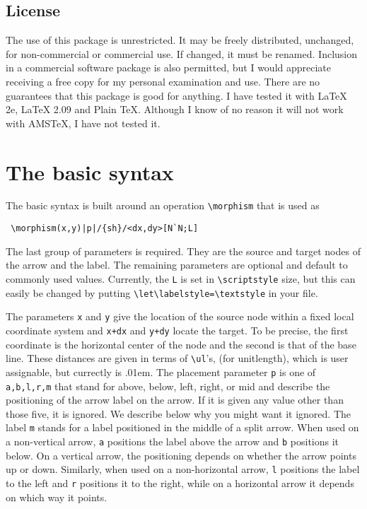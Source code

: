 \documentclass[12pt]{article}
\begin{document}
{\subsection{License}
 The use of this package is unrestricted.  It may be freely distributed,
unchanged, for non-commercial or commercial use.  If changed, it must be
renamed.  Inclusion in a commercial software package is also permitted,
but I would appreciate receiving a free copy for my personal examination
and use.  There are no guarantees that this package is good for
anything.  I have tested it with LaTeX 2e, LaTeX 2.09 and Plain TeX.
Although I know of no reason it will not work with AMSTeX, I have not
tested it.

\section{The basic syntax}

The basic syntax is built around an operation
\verb.\morphism.  that is
used as 
 \begin{verbatim}
 \morphism(x,y)|p|/{sh}/<dx,dy>[N`N;L]
 \end{verbatim}
 The last group of parameters is required.  They are the source and
target nodes of the arrow and the label.  The remaining parameters are
optional and default to commonly used values.  Currently, the
\verb.L. is set in \verb.\scriptstyle.
size, but this can easily be changed by putting
\verb.\let\labelstyle=\textstyle. in
your file.

 The parameters \verb.x. and \verb.y. give the location of the source
node within a fixed local coordinate system and \verb-x+dx- and
\verb-y+dy- locate the target.  To be precise, the first coordinate is
the horizontal center of the node and the second is that of the base
line.  These distances are given in terms of \verb.\ul.'s,
(for unitlength), which is user assignable, but currectly is .01em.  The
placement parameter \verb.p. is one of \verb.a,b,l,r,m. that stand for
above, below, left, right, or mid and describe the positioning of the
arrow label on the arrow.  If it is given any value other than those
five, it is ignored.  We describe below why you might want it ignored.
The label \verb.m. stands for a label positioned in the middle
of a split arrow.  When used on a non-vertical arrow, \verb.a.
positions the label above the arrow and \verb.b. positions it
below.  On a vertical arrow, the positioning depends on whether the
arrow points up or down.  Similarly, when used on a non-horizontal
arrow, \verb.l. positions the label to the left and
\verb.r. positions it to the right, while on a horizontal arrow
it depends on which way it points.

}
\end{document}

